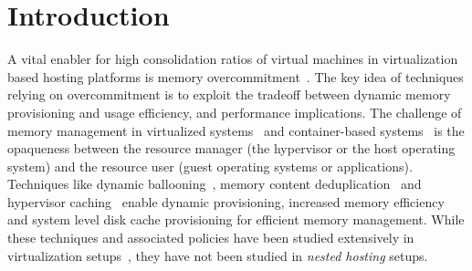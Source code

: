 \section{Introduction}
\label{sec:intro}

A vital enabler for high consolidation ratios of virtual machines
in virtualization based hosting platforms
is memory overcommitment~\cite{vmware,vmware:memory}. 
%
The key idea of techniques relying on
overcommitment is to exploit the tradeoff between
dynamic memory provisioning and usage efficiency, and 
performance implications.
%
%
%
%
The challenge of memory management in virtualized systems~\cite{xen,kvm,vmware}
and container-based systems~\cite{cgroup,docker,lxc} is 
the opaqueness between the resource manager (the hypervisor or
the host operating system) and the resource user (guest operating
systems or applications).
%
%
Techniques like dynamic ballooning~\cite{vmware,hotplug}, memory
content deduplication~\cite{vmware,ksmpaper} and hypervisor 
caching~\cite{memtrans,oracletmem,kvmzcache, geiger} 
enable dynamic provisioning, increased memory efficiency and 
system level disk cache provisioning for efficient memory 
management. %
%
While these techniques and associated policies have been studied
extensively in virtualization setups~\cite{vmware, membal, membud, kvmzcache, tws},
they have not been studied in \emph{nested hosting} setups.

